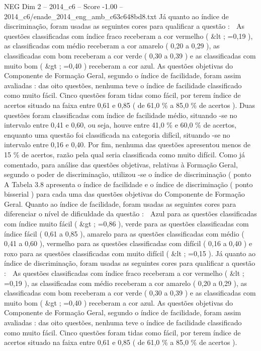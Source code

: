 \begin{textsample}{NEG Dim 2 – 2014\_c6 – Score -1.00 – 2014\_c6/enade\_2014\_eng\_amb\_c63c648bd8.txt}
Já quanto ao índice de discriminação, foram usadas as seguintes cores para qualificar a questão :  As questões classificadas com índice fraco receberam a cor vermelho ( \&lt ; =0,19 ), as classificadas com médio receberam a cor amarelo ( 0,20 a 0,29 ), as classificadas com bom receberam a cor verde ( 0,30 a 0,39 ) e as classificadas com muito bom ( \&gt ; =0,40 ) receberam a cor azul.
As questões objetivas do Componente de Formação Geral, segundo o índice de facilidade, foram assim avaliadas : das oito questões, nenhuma teve o índice de facilidade classificado como muito fácil.
Cinco questões foram tidas como fácil, por terem índice de acertos situado na faixa entre 0,61 e 0,85 ( de 61,0 \% a 85,0 \% de acertos ).
Duas questões foram classificadas com índice de facilidade médio, situando -se no intervalo entre 0,41 e 0,60, ou seja, houve entre 41,0 \% e 60,0 \% de acertos, enquanto uma questão foi classificada na categoria difícil, situando -se no intervalo entre 0,16 e 0,40.
Por fim, nenhuma das questões apresentou menos de 15 \% de acertos, razão pela qual seria classificada como muito difícil.
Como já comentado, para análise das questões objetivas, relativas à Formação Geral, segundo o poder de discriminação, utilizou -se o índice de discriminação ( ponto A Tabela 3.8 apresenta o índice de facilidade e o índice de discriminação ( ponto bisserial ) para cada uma das questões objetivas do Componente de Formação Geral.
Quanto ao índice de facilidade, foram usadas as seguintes cores para diferenciar o nível de dificuldade da questão :  Azul para as questões classificadas com índice muito fácil ( \&gt ; =0,86 ), verde para as questões classificadas com índice fácil ( 0,61 a 0,85 ), amarelo para as questões classificadas com médio ( 0,41 a 0,60 ), vermelho para as questões classificadas com difícil ( 0,16 a 0,40 ) e roxo para as questões classificadas com muito difícil ( \&lt ; =0,15 ).
Já quanto ao índice de discriminação, foram usadas as seguintes cores para qualificar a questão :  As questões classificadas com índice fraco receberam a cor vermelho ( \&lt ; =0,19 ), as classificadas com médio receberam a cor amarelo ( 0,20 a 0,29 ), as classificadas com bom receberam a cor verde ( 0,30 a 0,39 ) e as classificadas com muito bom ( \&gt ; =0,40 ) receberam a cor azul.
As questões objetivas do Componente de Formação Geral, segundo o índice de facilidade, foram assim avaliadas : das oito questões, nenhuma teve o índice de facilidade classificado como muito fácil.
Cinco questões foram tidas como fácil, por terem índice de acertos situado na faixa entre 0,61 e 0,85 ( de 61,0 \% a 85,0 \% de acertos ).

\end{textsample}
